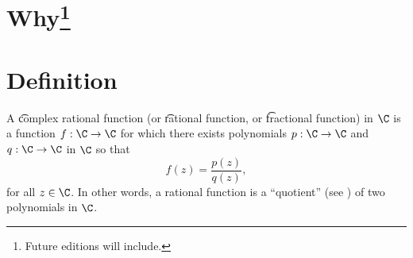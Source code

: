 
\section*{Why\footnote{Future editions will include.}}

\section*{Definition}

A \t{complex rational function} (or \t{rational function}, or \t{fractional function}) in $\C $ is a function $f: \C  \to \C $ for which there exists polynomials $p: \C  \to \C $ and $q: \C \to \C $ in $\C $ so that
\[
f(z) = \frac{p(z)}{q(z)},
\]
for all $z \in \C $.
In other words, a rational function is a ``quotient'' (see ) of two polynomials in $\C $.

\blankpage